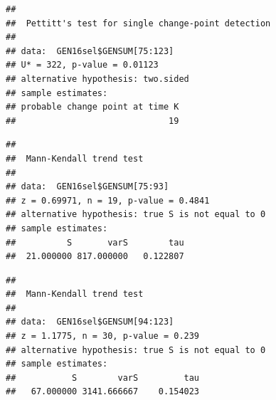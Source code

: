 \documentclass[12pt,]{article}
\newenvironment{Shaded}{\begin{snugshade}}{\end{snugshade}}
\newcommand{\KeywordTok}[1]{\textcolor[rgb]{0.13,0.29,0.53}{\textbf{#1}}}
\newcommand{\DecValTok}[1]{\textcolor[rgb]{0.00,0.00,0.81}{#1}}
\newcommand{\CommentTok}[1]{\textcolor[rgb]{0.56,0.35,0.01}{\textit{#1}}}
\newcommand{\OperatorTok}[1]{\textcolor[rgb]{0.81,0.36,0.00}{\textbf{#1}}}
\newcommand{\NormalTok}[1]{#1}
\begin{document}
\begin{Shaded}
\end{Shaded}

\begin{verbatim}
## 
##  Pettitt's test for single change-point detection
## 
## data:  GEN16sel$GENSUM[75:123]
## U* = 322, p-value = 0.01123
## alternative hypothesis: two.sided
## sample estimates:
## probable change point at time K 
##                              19
\end{verbatim}

\begin{Shaded}
\end{Shaded}

\begin{verbatim}
## 
##  Mann-Kendall trend test
## 
## data:  GEN16sel$GENSUM[75:93]
## z = 0.69971, n = 19, p-value = 0.4841
## alternative hypothesis: true S is not equal to 0
## sample estimates:
##          S       varS        tau 
##  21.000000 817.000000   0.122807
\end{verbatim}

\begin{Shaded}
\end{Shaded}

\begin{verbatim}
## 
##  Mann-Kendall trend test
## 
## data:  GEN16sel$GENSUM[94:123]
## z = 1.1775, n = 30, p-value = 0.239
## alternative hypothesis: true S is not equal to 0
## sample estimates:
##           S        varS         tau 
##   67.000000 3141.666667    0.154023
\end{verbatim}
\end{document}
